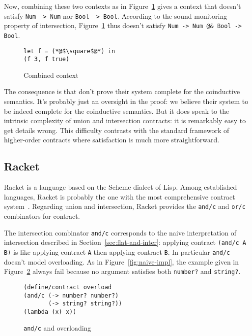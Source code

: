 \documentclass[sigplan,screen,10pt]{acmart}
\newcommand{\nickel}[1]{\lstinline[language=nickel]{#1}}
\newcommand{\racket}[1]{\lstinline[language=racket]{#1}}
\begin{document}
Now, combining these two contexts as in Figure~\ref{fig:invalid-context} gives a context
that doesn't satisfy \nickel{Num -> Num} nor \hbox{\nickel{Bool -> Bool}.}  According
to the sound monitoring property of intersection, Figure~\ref{fig:invalid-context} thus doesn't satisfy \nickel{Num
-> Num @& Bool -> Bool}.

\begin{figure}[h]
\begin{lstlisting}[language=nickel]
let f = (*@$\square$@*) in
(f 3, f true)
\end{lstlisting}
\caption{Combined context}
\label{fig:invalid-context}
\end{figure}

The consequence is that \citeauthor{RootCauseOfBlame} don't prove their system
complete for the coinductive semantics.  It's probably just an oversight in the
proof: we believe their system to be indeed complete for the coinductive
semantics. But it does speak to the intrinsic complexity of union and
intersection contracts: it is remarkably easy to get details wrong.  This
difficulty contrasts with the standard framework of higher-order contracts where
satisfaction is much more straightforward.

\subsection{Racket}
\label{sec:racket}

Racket is a language based on the Scheme dialect of Lisp. Among established
languages, Racket is probably the one with the most comprehensive contract
system~\cite{RacketContracts}. Regarding union and intersection, Racket provides
the \racket{and/c} and \racket{or/c} combinators for contract.

The
intersection combinator \racket{and/c} corresponds to the naive
interpretation of intersection described in
Section~\ref{sec:flat-and-inter}: applying contract \racket{(and/c A
  B)} is like applying contract \racket{A} then applying contract \racket{B}. In
particular \racket{and/c} doesn't model overloading. As in
Figure~\ref{fig:naive-impl}, the example given in
Figure~\ref{fig:racket-overloading} always fail because no argument satisfies
both \racket{number?} and \racket{string?}.

\begin{figure}[h]
\begin{lstlisting}[language=racket]
(define/contract overload
(and/c (-> number? number?)
       (-> string? string?))
(lambda (x) x))
\end{lstlisting}
\caption{\racket{and/c} and overloading}
\label{fig:racket-overloading}
\end{figure}
\end{document}
